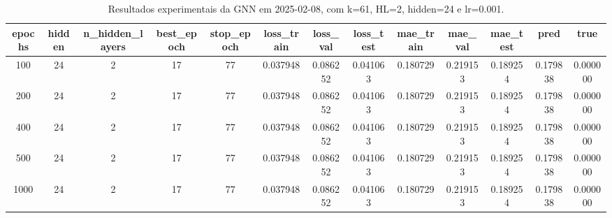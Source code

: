 \begin{table}[h]
\centering
\caption{Resultados experimentais da GNN em 2025-02-08, com k=61, HL=2, hidden=24 e lr=0.001.}
\label{tab:gnn_results_k61_hl2_h24_d20250208}
\begin{tabular}{ccccccccccccc}
\toprule
epochs & hidden & n\_hidden\_layers & best\_epoch & stop\_epoch & loss\_train & loss\_val & loss\_test & mae\_train & mae\_val & mae\_test & pred & true \\
\midrule
100 & 24 & 2 & 17 & 77 & 0.037948 & 0.086252 & 0.041063 & 0.180729 & 0.219153 & 0.189254 & 0.179838 & 0.000000 \\
200 & 24 & 2 & 17 & 77 & 0.037948 & 0.086252 & 0.041063 & 0.180729 & 0.219153 & 0.189254 & 0.179838 & 0.000000 \\
400 & 24 & 2 & 17 & 77 & 0.037948 & 0.086252 & 0.041063 & 0.180729 & 0.219153 & 0.189254 & 0.179838 & 0.000000 \\
500 & 24 & 2 & 17 & 77 & 0.037948 & 0.086252 & 0.041063 & 0.180729 & 0.219153 & 0.189254 & 0.179838 & 0.000000 \\
1000 & 24 & 2 & 17 & 77 & 0.037948 & 0.086252 & 0.041063 & 0.180729 & 0.219153 & 0.189254 & 0.179838 & 0.000000 \\
\bottomrule
\end{tabular}
\end{table}
